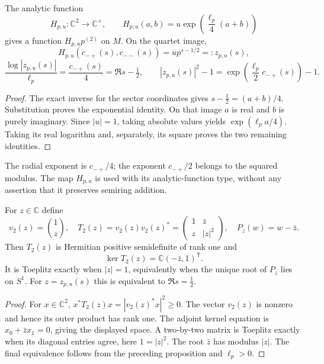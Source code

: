\begin{proposition}
\label{prop:sz-sector-holonomy}
The analytic function
\[
H_{p,u}:\mathbb C^2\to\mathbb C^\times,\qquad
H_{p,u}(a,b)=u\exp\!\left(\frac{\ell_p}{4}(a+b)\right)
\]
gives a function $H_{p,u}p^{(2)}$ on $M$. On the quartet image,
\[
H_{p,u}(c_{-+}(s),c_{--}(s))=u p^{s-1/2}=:z_{p,u}(s),
\]
\[
\frac{\log|z_{p,u}(s)|}{\ell_p}
=\frac{c_{-+}(s)}4=\Re s-\tfrac12,\qquad
|z_{p,u}(s)|^2-1=\exp\!\left(\frac{\ell_p}{2}c_{-+}(s)\right)-1.
\]
\end{proposition}
\begin{proof}
The exact inverse for the sector coordinates gives $s-\tfrac12=(a+b)/4$. Substitution proves the exponential identity. On that image $a$ is real and $b$ is purely imaginary. Since $|u|=1$, taking absolute values yields $\exp(\ell_p a/4)$. Taking its real logarithm and, separately, its square proves the two remaining identities.
\end{proof}

The radial exponent is $c_{-+}/4$; the exponent $c_{-+}/2$ belongs to the squared modulus. The map $H_{p,u}$ is used with its analytic-function type, without any assertion that it preserves semiring addition.

\begin{proposition}
\label{prop:sz-rank-one-packet}
For $z\in\mathbb C$ define
\[
v_2(z)=\binom1z,\quad T_2(z)=v_2(z)v_2(z)^*
=\begin{pmatrix}1&\bar z\\z&|z|^2\end{pmatrix},\quad P_z(w)=w-\bar z.
\]
Then $T_2(z)$ is Hermitian positive semidefinite of rank one and
\[
\ker T_2(z)=\mathbb C(-\bar z,1)^\mathsf T.
\]
It is Toeplitz exactly when $|z|=1$, equivalently when the unique root of $P_z$ lies on $S^1$. For $z=z_{p,u}(s)$ this is equivalent to $\Re s=\tfrac12$.
\end{proposition}
\begin{proof}
For $x\in\mathbb C^2$, $x^*T_2(z)x=|v_2(z)^*x|^2\ge0$. The vector $v_2(z)$ is nonzero and hence its outer product has rank one. The adjoint kernel equation is $x_0+\bar z x_1=0$, giving the displayed space. A two-by-two matrix is Toeplitz exactly when its diagonal entries agree, here $1=|z|^2$. The root $\bar z$ has modulus $|z|$. The final equivalence follows from the preceding proposition and $\ell_p>0$.
\end{proof}

